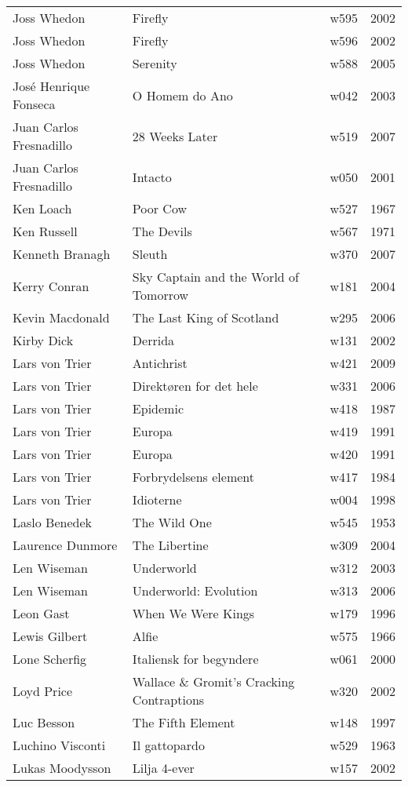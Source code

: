 \documentclass{article}
\begin{document}
\begin {center}
\begin{longtable}{l p{10cm} l l}
Joss Whedon & Firefly & w595 & 2002 \\
Joss Whedon & Firefly & w596 & 2002 \\
Joss Whedon & Serenity & w588 & 2005 \\
José Henrique Fonseca & O Homem do Ano & w042 & 2003 \\
Juan Carlos Fresnadillo & 28 Weeks Later & w519 & 2007 \\
Juan Carlos Fresnadillo & Intacto & w050 & 2001 \\
Ken Loach & Poor Cow & w527 & 1967 \\
Ken Russell & The Devils & w567 & 1971 \\
Kenneth Branagh & Sleuth & w370 & 2007 \\
Kerry Conran & Sky Captain and the World of Tomorrow & w181 & 2004 \\
Kevin Macdonald & The Last King of Scotland & w295 & 2006 \\
Kirby Dick & Derrida & w131 & 2002 \\
Lars von Trier & Antichrist & w421 & 2009 \\
Lars von Trier & Direktøren for det hele & w331 & 2006 \\
Lars von Trier & Epidemic & w418 & 1987 \\
Lars von Trier & Europa & w419 & 1991 \\
Lars von Trier & Europa & w420 & 1991 \\
Lars von Trier & Forbrydelsens element & w417 & 1984 \\
Lars von Trier & Idioterne & w004 & 1998 \\
Laslo Benedek & The Wild One & w545 & 1953 \\
Laurence Dunmore & The Libertine & w309 & 2004 \\
Len Wiseman & Underworld & w312 & 2003 \\
Len Wiseman & Underworld: Evolution & w313 & 2006 \\
Leon Gast & When We Were Kings & w179 & 1996 \\
Lewis Gilbert & Alfie & w575 & 1966 \\
Lone Scherfig & Italiensk for begyndere & w061 & 2000 \\
Loyd Price & Wallace \& Gromit's Cracking Contraptions & w320 & 2002 \\
Luc Besson & The Fifth Element & w148 & 1997 \\
Luchino Visconti & Il gattopardo & w529 & 1963 \\
Lukas Moodysson & Lilja 4-ever & w157 & 2002 \\

\end{longtable}
\end{center}
\end{document}
